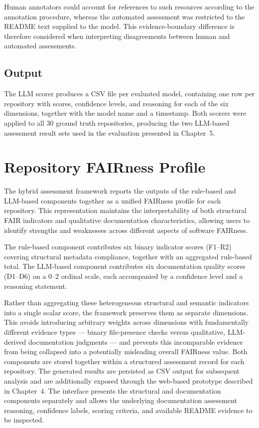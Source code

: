 Human annotators could account for references to such resources
according to the annotation procedure, whereas the automated
assessment was restricted to the README text supplied to the model.
This evidence-boundary difference is therefore considered when
interpreting disagreements between human and automated assessments.

\subsection{Output}

The LLM scorer produces a CSV file per evaluated model, containing 
one row per repository with scores, confidence levels, and reasoning 
for each of the six dimensions, together with the model name and a 
timestamp. Both scorers were applied to all 30 ground truth repositories, 
producing the two LLM-based assessment result sets used in the evaluation 
presented in Chapter~5.

\section{Repository FAIRness Profile}

The hybrid assessment framework reports the outputs of the
rule-based and LLM-based components together as a unified FAIRness
profile for each repository. This representation maintains the
interpretability of both structural FAIR indicators and qualitative
documentation characteristics, allowing users to identify strengths
and weaknesses across different aspects of software FAIRness.

The rule-based component contributes six binary indicator scores 
(F1--R2) covering structural metadata compliance, together with 
an aggregated rule-based total. The LLM-based component contributes 
six documentation quality scores (D1--D6) on a 0--2 ordinal scale, 
each accompanied by a confidence level and a reasoning statement.

Rather than aggregating these heterogeneous structural and semantic
indicators into a single scalar score, the framework preserves them
as separate dimensions. This avoids introducing arbitrary weights
across dimensions with fundamentally different evidence types ---
binary file-presence checks versus qualitative, LLM-derived
documentation judgments --- and prevents this incomparable evidence
from being collapsed into a potentially misleading overall FAIRness
value. Both components are stored together within a structured assessment
record for each repository. The generated results are persisted as
CSV output for subsequent analysis and are additionally exposed
through the web-based prototype described in Chapter~4. The interface
presents the structural and documentation components separately and
allows the underlying documentation assessment reasoning, confidence
labels, scoring criteria, and available README evidence to be
inspected.

